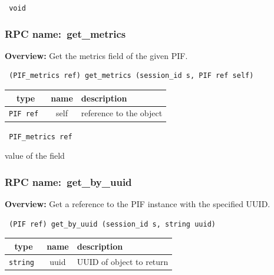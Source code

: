 \vspace{0.3cm}

{\tt 
void
}



\vspace{0.3cm}
\vspace{0.3cm}
\vspace{0.3cm}
\subsubsection{RPC name:~get\_metrics}

{\bf Overview:} 
Get the metrics field of the given PIF.

\begin{verbatim} (PIF_metrics ref) get_metrics (session_id s, PIF ref self)\end{verbatim}



 
\vspace{0.3cm}
\begin{tabular}{|c|c|p{7cm}|}
 \hline
{\bf type} & {\bf name} & {\bf description} \\ \hline
{\tt PIF ref } & self & reference to the object \\ \hline 

\end{tabular}

\vspace{0.3cm}

{\tt 
PIF\_metrics ref
}


value of the field
\vspace{0.3cm}
\vspace{0.3cm}
\vspace{0.3cm}
\subsubsection{RPC name:~get\_by\_uuid}

{\bf Overview:} 
Get a reference to the PIF instance with the specified UUID.

\begin{verbatim} (PIF ref) get_by_uuid (session_id s, string uuid)\end{verbatim}



 
\vspace{0.3cm}
\begin{tabular}{|c|c|p{7cm}|}
 \hline
{\bf type} & {\bf name} & {\bf description} \\ \hline
{\tt string } & uuid & UUID of object to return \\ \hline 

\end{tabular}

